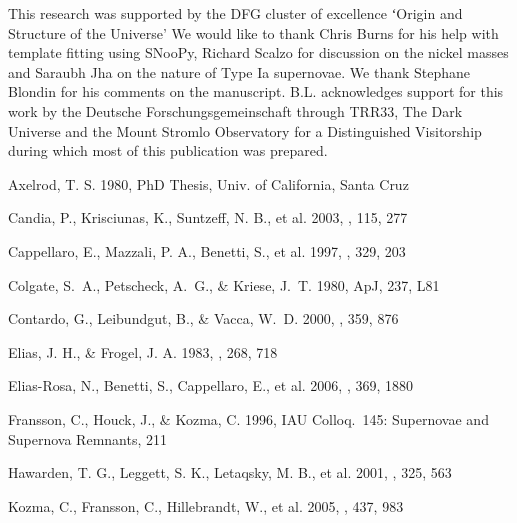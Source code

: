 \documentclass{aa}
\begin{document}
\begin{acknowledgements}
This research was supported by the DFG cluster of excellence ʻOrigin and
Structure of the Universe' We would like to thank Chris Burns for his
help with template fitting using SNooPy, Richard Scalzo for discussion
on the nickel masses and Saraubh Jha on the nature of Type Ia
supernovae. We thank Stephane Blondin for his comments on the manuscript.
B.L. acknowledges support for this work by the Deutsche
Forschungsgemeinschaft through TRR33, The Dark Universe and the Mount
Stromlo Observatory for a Distinguished Visitorship during which most of
this publication was prepared.



\end{acknowledgements}
\iffalse
\begin{thebibliography}{}
%

Axelrod, T. S. 1980, PhD Thesis, Univ. of California, Santa Cruz

Candia, P., Krisciunas, K., Suntzeff, N. B., et al. 2003, \pasp, 115, 277

Cappellaro, E., Mazzali, P. A., Benetti, S., et al. 1997, \aap, 329, 203

Colgate, S.~A., Petscheck, A.~G., \& Kriese, J.~T. 1980, ApJ, 237, L81

Contardo, G., Leibundgut, B., \& Vacca, W.~D. 2000, \aap, 359, 876

Elias, J. H., \& Frogel, J. A. 1983, \apj, 268, 718

Elias-Rosa, N., Benetti, S., Cappellaro, E., et al. 2006, \mnras, 369, 1880

Fransson, C., Houck, J., \& Kozma, C. 1996, 
IAU Colloq.~145: Supernovae and Supernova Remnants, 211 

Hawarden, T. G., Leggett, S. K., Letaqsky, M. B., et al. 2001, \mnras, 325, 563


Kozma, C., Fransson, C., Hillebrandt, W., et al. 2005, \aap, 437, 983


\end{thebibliography}
\end{document}
